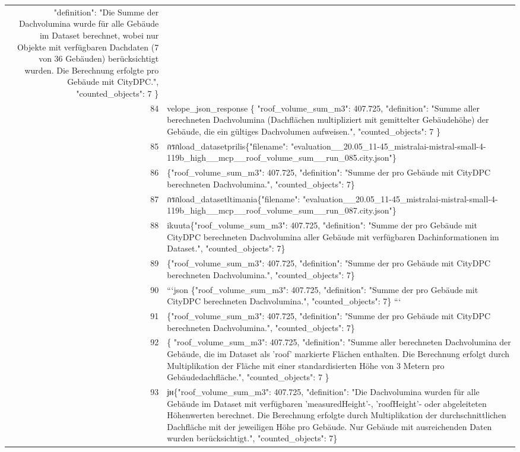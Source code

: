 \documentclass[a4paper,11pt]{article}
\begin{document}
\begin{table}[ht]
\begin{tabular}{r p{12cm}}
  "definition": "Die Summe der Dachvolumina wurde für alle Gebäude im Dataset berechnet, wobei nur Objekte mit verfügbaren Dachdaten (7 von 36 Gebäuden) berücksichtigt wurden. Die Berechnung erfolgte pro Gebäude mit CityDPC.",
  "counted\_objects": 7
\} \\
84 & velope\_json\_response
\{
  "roof\_volume\_sum\_m3": 407.725,
  "definition": "Summe aller berechneten Dachvolumina (Dachflächen multipliziert mit gemittelter Gebäudehöhe) der Gebäude, die ein gültiges Dachvolumen aufweisen.",
  "counted\_objects": 7
\} \\
85 &  กรกload\_datasetprilis\{"filename": "evaluation\_\_20.05\_11-45\_mistralai-mistral-small-4-119b\_high\_\_mcp\_\_roof\_volume\_sum\_\_run\_085.city.json"\} \\
86 & \{"roof\_volume\_sum\_m3": 407.725, "definition": "Summe der pro Gebäude mit CityDPC berechneten Dachvolumina.", "counted\_objects": 7\} \\
87 &  กรกload\_datasetltimania\{"filename": "evaluation\_\_20.05\_11-45\_mistralai-mistral-small-4-119b\_high\_\_mcp\_\_roof\_volume\_sum\_\_run\_087.city.json"\} \\
88 & ikuuta\{"roof\_volume\_sum\_m3": 407.725, "definition": "Summe der pro Gebäude mit CityDPC berechneten Dachvolumina aller Gebäude mit verfügbaren Dachinformationen im Dataset.", "counted\_objects": 7\} \\
89 & \{"roof\_volume\_sum\_m3": 407.725, "definition": "Summe der pro Gebäude mit CityDPC berechneten Dachvolumina.", "counted\_objects": 7\} \\
90 & ```json
\{"roof\_volume\_sum\_m3": 407.725, "definition": "Summe der pro Gebäude mit CityDPC berechneten Dachvolumina.", "counted\_objects": 7\}
``` \\
91 & \{"roof\_volume\_sum\_m3": 407.725, "definition": "Summe der pro Gebäude mit CityDPC berechneten Dachvolumina.", "counted\_objects": 7\} \\
92 & \{
  "roof\_volume\_sum\_m3": 407.725,
  "definition": "Summe aller berechneten Dachvolumina der Gebäude, die im Dataset als 'roof' markierte Flächen enthalten. Die Berechnung erfolgt durch Multiplikation der Fläche mit einer standardisierten Höhe von 3 Metern pro Gebäudedachfläche.",
  "counted\_objects": 7
\} \\
93 & јн\{"roof\_volume\_sum\_m3": 407.725, "definition": "Die Dachvolumina wurden für alle Gebäude im Dataset mit verfügbaren 'measuredHeight'-, 'roofHeight'- oder abgeleiteten Höhenwerten berechnet. Die Berechnung erfolgte durch Multiplikation der durchschnittlichen Dachfläche mit der jeweiligen Höhe pro Gebäude. Nur Gebäude mit ausreichenden Daten wurden berücksichtigt.", "counted\_objects": 7\} \\

\end{tabular}
\end{table}
\end{document}

